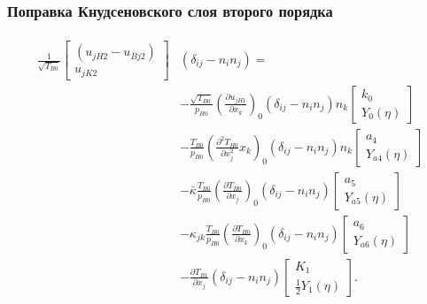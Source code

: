 \documentclass[mathserif]{beamer} %
\newcommand{\pder}[2][]{\frac{\partial#1}{\partial#2}}
\newcommand{\pderder}[2][]{\frac{\partial^2 #1}{\partial #2^2}}
\newcommand{\deltann}[2]{(\delta_{#1#2}-n_#1 n_#2)}
\newcommand{\onwall}[1]{\left(#1\right)_0}
\begin{document}
\begin{frame}
    \frametitle{Поправка Кнудсеновского слоя второго порядка}
    \footnotesize
    \begin{gather}
        \begin{aligned}
            \frac1{\sqrt{T_{B0}}}
                \begin{bmatrix} (u_{jH2} - u_{Bj2}) \\ u_{jK2} \end{bmatrix}&\deltann{i}{j} = \\
            &- \frac{\sqrt{T_{B0}}}{p_{H0}}\onwall{\pder[u_{jH1}]{x_k}} \deltann{i}{j}n_k
                \begin{bmatrix} k_0 \\ Y_0(\eta) \end{bmatrix} \\
            &- \frac{T_{B0}}{p_{H0}}\onwall{\pderder[T_{H0}]{x_j}{x_k}} \deltann{i}{j}n_k
                \begin{bmatrix} a_4 \\ Y_{a4}(\eta) \end{bmatrix} \\
            &- \bar\kappa\frac{T_{B0}}{p_{H0}}\onwall{\pder[T_{H0}]{x_j}} \deltann{i}{j}
                \begin{bmatrix} a_5 \\ Y_{a5}(\eta) \end{bmatrix} \\
            &- \kappa_{jk}\frac{T_{B0}}{p_{H0}}\onwall{\pder[T_{H0}]{x_k}} \deltann{i}{j}
                \begin{bmatrix} a_6 \\ Y_{a6}(\eta) \end{bmatrix} \\
            &- \pder[T_{B1}]{x_j} \deltann{i}{j}
                \begin{bmatrix} K_1 \\ \frac12 Y_1(\eta) \end{bmatrix}.
        \end{aligned}\label{eq:boundary_u2t}
    \end{gather}
\end{frame}
\end{document}
